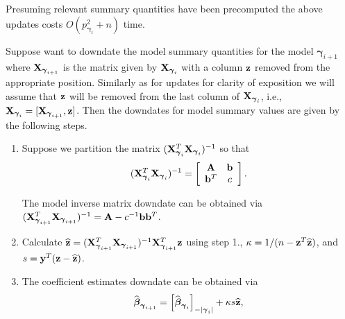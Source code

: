 \documentclass[12pt]{article}
\def\vectorfontone{\bf}
\def\vectorfonttwo{\boldsymbol}
\def\vb{{\vectorfontone b}}                      %
\def\vy{{\vectorfontone y}}                      %
\def\vz{{\vectorfontone z}}                      %
\def\vbeta{{\vectorfonttwo \beta}}               %
\def\vgamma{{\vectorfonttwo \gamma}}             %
\def\matrixfontone{\bf}
\def\mA{{\matrixfontone A}}                      %
\def\mX{{\matrixfontone X}}                      %
\def\ds{\displaystyle}
\begin{document}
\noindent Presuming relevant summary quantities have been precomputed
the above updates costs $O(p_{\vgamma_{i}}^2 + n)$ time.

Suppose want to downdate the model summary quantities for the model
$\vgamma_{i+1}$ where $\mX_{\vgamma_{i+1}}$ is the matrix given by 
$\mX_{\vgamma_i}$ with a column $\vz$ removed from the appropriate position.
Similarly as for updates for clarity of exposition we will assume that
$\vz$ will be removed from the last column of $\mX_{\vgamma_i}$, i.e., 
$\mX_{\vgamma_{i}} = [\mX_{\vgamma_{i+1}}, \vz]$. 
Then the downdates for model summary values are given by the following steps.
\begin{enumerate}
	\item 
	Suppose we partition the matrix
	$(\mX_{\vgamma_{i}}^T\mX_{\vgamma_{i}})^{-1}$ so that
	$$
	\ds (\mX_{\vgamma_{i}}^T\mX_{\vgamma_{i}})^{-1} 
	= \left[ \begin{array}{cc}
	\mA   & \vb \\
	\vb^T & c \\
	\end{array} \right].
	$$
	
	\noindent The model inverse matrix downdate can be obtained
	via   $(\mX_{\vgamma_{i+1}}^T\mX_{\vgamma_{i+1}})^{-1} = \mA - c^{-1}\vb\vb^T$.
	
	\item Calculate
	$\widehat{\vz} = (\mX_{\vgamma_{i+1}}^T\mX_{\vgamma_{i+1}})^{-1}\mX_{\vgamma_{i+1}}^T\vz$ using step 1.,
	$\kappa = 1/(n - \vz^T\widehat{\vz})$,
	and $s = \vy^T(\vz - \widehat{\vz})$.
	
	\item 
	The coefficient estimates downdate can be obtained
	via
	$$
	\widehat{\vbeta}_{\vgamma_{i+1}} = \left[ \widehat{\vbeta}_{\vgamma_{i}} \right]_{-|{\vgamma_{i}}|} + \kappa s\widehat{\vz},
	$$
	

\end{enumerate}
\end{document}
